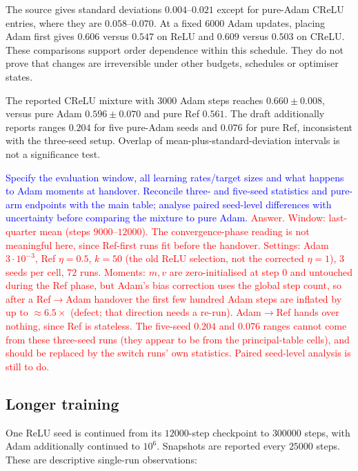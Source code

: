 \documentclass{article}
\newcommand{\zied}[1]{\textcolor{blue}{#1}}
\newcommand{\nat}[1]{\textcolor{red}{#1}}
\theoremstyle{definition}
\theoremstyle{remark}
\begin{document}
The source gives standard deviations $0.004$--$0.021$ except for pure-Adam CReLU entries, where they are $0.058$--$0.070$. At a fixed $6000$ Adam updates, placing Adam first gives $0.606$ versus $0.547$ on ReLU and $0.609$ versus $0.503$ on CReLU. These comparisons support order dependence within this schedule. They do not prove that changes are irreversible under other budgets, schedules or optimiser states.

The reported CReLU mixture with $3000$ Adam steps reaches $0.660\pm0.008$, versus pure Adam $0.596\pm0.070$ and pure Ref $0.561$. The draft additionally reports ranges $0.204$ for five pure-Adam seeds and $0.076$ for pure Ref, inconsistent with the three-seed setup. Overlap of mean-plus-standard-deviation intervals is not a significance test.

\zied{Specify the evaluation window, all learning rates/target sizes and what happens to Adam moments at handover. Reconcile three- and five-seed statistics and pure-arm endpoints with the main table; analyse paired seed-level differences with uncertainty before comparing the mixture to pure Adam.}
\nat{Answer. Window: last-quarter mean (steps $9000$--$12000$). The convergence-phase reading is not meaningful here, since Ref-first runs fit before the handover. Settings: Adam $3\cdot10^{-3}$, Ref $\eta=0.5$, $k=50$ (the old ReLU selection, not the corrected $\eta=1$), $3$ seeds per cell, $72$ runs. Moments: $m,v$ are zero-initialised at step $0$ and untouched during the Ref phase, but Adam's bias correction uses the global step count, so after a Ref$\to$Adam handover the first few hundred Adam steps are inflated by up to $\approx6.5\times$ (defect; that direction needs a re-run). Adam$\to$Ref hands over nothing, since Ref is stateless. The five-seed $0.204$ and $0.076$ ranges cannot come from these three-seed runs (they appear to be from the principal-table cells), and should be replaced by the switch runs' own statistics. Paired seed-level analysis is still to do.}

\subsection{Longer training}\label{app:e14}

One ReLU seed is continued from its $12000$-step checkpoint to $300000$ steps, with Adam additionally continued to $10^6$. Snapshots are reported every $25000$ steps. These are descriptive single-run observations:
\end{document}
